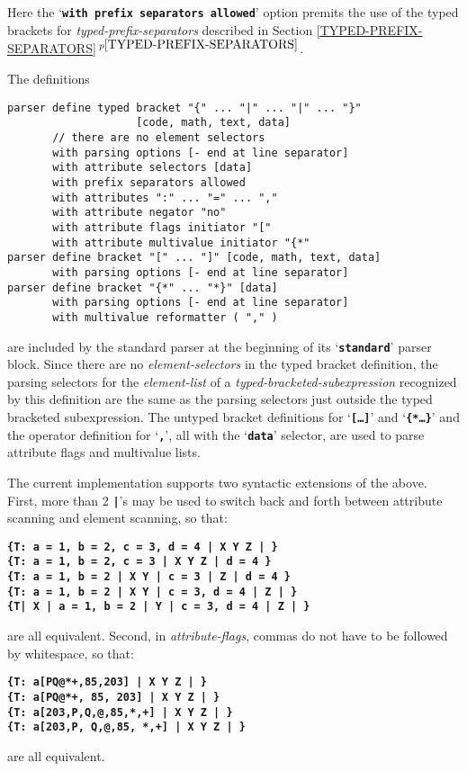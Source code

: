 \documentclass[12pt]{article}
\newcommand{\TT}[1]{{\tt \bfseries #1}}
\newcommand{\itemref}[1]{\ref{#1}$\,^{p\pageref{#1}}$}
\newenvironment{indpar}[1][0.3in]%
	{\begin{list}{}%
		     {\setlength{\itemsep}{0in}%
		      \setlength{\topsep}{0in}%
		      \setlength{\parsep}{1ex}%
		      \setlength{\labelwidth}{#1}%
		      \setlength{\leftmargin}{#1}%
		      \addtolength{\leftmargin}{\labelsep}}%
	 \item}%
	{\end{list}}
\begin{document}
Here the `\TT{with prefix separators allowed}' option premits the use of
the typed brackets for {\em typed-prefix-separators} described in
Section \itemref{TYPED-PREFIX-SEPARATORS}.

The definitions
\begin{indpar}\begin{verbatim}
parser define typed bracket "{" ... "|" ... "|" ... "}"
                    [code, math, text, data]
       // there are no element selectors
       with parsing options [- end at line separator]
       with attribute selectors [data]
       with prefix separators allowed
       with attributes ":" ... "=" ... ","
       with attribute negator "no"
       with attribute flags initiator "["
       with attribute multivalue initiator "{*"
parser define bracket "[" ... "]" [code, math, text, data]
       with parsing options [- end at line separator]
parser define bracket "{*" ... "*}" [data]
       with parsing options [- end at line separator]
       with multivalue reformatter ( "," )
\end{verbatim}\end{indpar}
are included by the standard parser at the beginning of
its `\TT{standard}' parser block.  Since there are no
{\em element-selectors} in the typed bracket definition,
the parsing selectors
for the {\em element-list} of a {\em typed-bracketed-subexpression}
recognized by this definition are the same as the parsing selectors
just outside the typed bracketed subexpression.
The untyped bracket definitions for `\TT{[\ldots]}' and
`\TT{\{*\ldots*\}}' and the operator definition for `\TT{,}',
all with the `\TT{data}' selector, are used to parse
attribute flags and multivalue lists.

The current implementation supports two syntactic extensions of
the above.  First, more than 2 \TT{|}'s may be used to switch
back and forth between attribute scanning and element scanning,
so that:
\begin{center}
\TT{\{T: a = 1, b = 2, c = 3, d = 4 | X Y Z | \}} \\
\TT{\{T: a = 1, b = 2, c = 3 | X Y Z | d = 4 \}} \\
\TT{\{T: a = 1, b = 2 | X Y | c = 3 | Z | d = 4 \}} \\
\TT{\{T: a = 1, b = 2 | X Y | c = 3, d = 4 | Z | \}} \\
\TT{\{T| X | a = 1, b = 2 | Y | c = 3, d = 4 | Z | \}} \\
\end{center}
are all equivalent.  Second, in {\em attribute-flags}, commas
do not have to be followed by whitespace, so that:
\begin{center}
\TT{\{T: a[PQ@*+,85,203] | X Y Z | \}} \\
\TT{\{T: a[PQ@*+, 85, 203] | X Y Z | \}} \\
\TT{\{T: a[203,P,Q,@,85,*,+] | X Y Z | \}} \\
\TT{\{T: a[203,P, Q,@,85, *,+] | X Y Z | \}} \\
\end{center}
are all equivalent.
\end{document}
